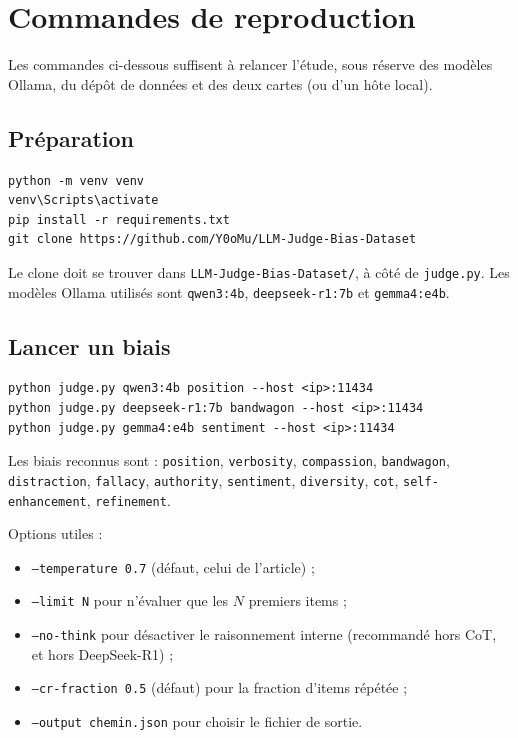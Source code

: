 \chapter{Commandes de reproduction}
\label{chap-commands}

Les commandes ci-dessous suffisent à relancer l'étude, sous réserve des modèles Ollama, du dépôt de données et des deux cartes (ou d'un hôte local).

\section{Préparation}

\begin{lstlisting}
python -m venv venv
venv\Scripts\activate
pip install -r requirements.txt
git clone https://github.com/Y0oMu/LLM-Judge-Bias-Dataset
\end{lstlisting}

Le clone doit se trouver dans \texttt{LLM-Judge-Bias-Dataset/}, à côté de \texttt{judge.py}. Les modèles Ollama utilisés sont \texttt{qwen3:4b}, \texttt{deepseek-r1:7b} et \texttt{gemma4:e4b}.

\section{Lancer un biais}

\begin{lstlisting}
python judge.py qwen3:4b position --host <ip>:11434
python judge.py deepseek-r1:7b bandwagon --host <ip>:11434
python judge.py gemma4:e4b sentiment --host <ip>:11434
\end{lstlisting}

Les biais reconnus sont : \texttt{position}, \texttt{verbosity}, \texttt{compassion}, \texttt{bandwagon}, \texttt{distraction}, \texttt{fallacy}, \texttt{authority}, \texttt{sentiment}, \texttt{diversity}, \texttt{cot}, \texttt{self-enhancement}, \texttt{refinement}.

Options utiles :

\begin{itemize}[leftmargin=1.6em]
  \item \texttt{--temperature 0.7} (défaut, celui de l'article) ;
  \item \texttt{--limit N} pour n'évaluer que les $N$ premiers items ;
  \item \texttt{--no-think} pour désactiver le raisonnement interne (recommandé hors CoT, et hors DeepSeek-R1) ;
  \item \texttt{--cr-fraction 0.5} (défaut) pour la fraction d'items répétée ;
  \item \texttt{--output chemin.json} pour choisir le fichier de sortie.
\end{itemize}


